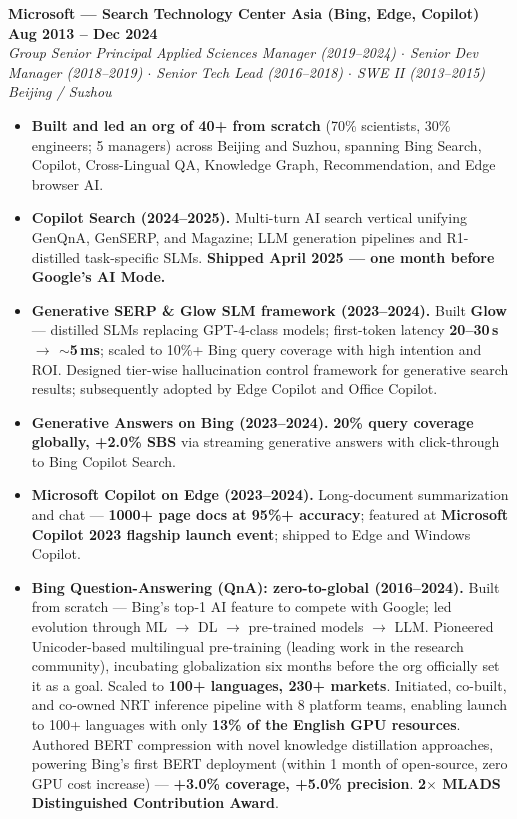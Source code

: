 \documentclass[10.5pt,letterpaper]{article}
\newcommand{\role}[4]{%
  \noindent\textbf{#1} \hfill \textbf{#3}\\
  \textit{#2} \hfill \textit{#4}\par\vspace{1pt}}
\begin{document}
\vspace{2pt}
\role{Microsoft --- Search Technology Center Asia (Bing, Edge, Copilot)}{Group Senior Principal Applied Sciences Manager (2019--2024) $\cdot$ Senior Dev Manager (2018--2019) $\cdot$ Senior Tech Lead (2016--2018) $\cdot$ SWE II (2013--2015)}{Aug 2013 -- Dec 2024}{Beijing / Suzhou}
\begin{itemize}
  \item \textbf{Built and led an org of 40+ from scratch} (70\% scientists, 30\% engineers; 5 managers) across Beijing and Suzhou, spanning Bing Search, Copilot, Cross-Lingual QA, Knowledge Graph, Recommendation, and Edge browser AI.
  \item \textbf{Copilot Search (2024--2025).} Multi-turn AI search vertical unifying GenQnA, GenSERP, and Magazine; LLM generation pipelines and R1-distilled task-specific SLMs. \textbf{Shipped April 2025 --- one month before Google's AI Mode.}
  \item \textbf{Generative SERP \& Glow SLM framework (2023--2024).} Built \textbf{Glow} --- distilled SLMs replacing GPT-4-class models; first-token latency \textbf{20--30\,s $\to$ $\sim$5\,ms}; scaled to 10\%+ Bing query coverage with high intention and ROI. Designed tier-wise hallucination control framework for generative search results; subsequently adopted by Edge Copilot and Office Copilot.
  \item \textbf{Generative Answers on Bing (2023--2024).} \textbf{20\% query coverage globally, +2.0\% SBS} via streaming generative answers with click-through to Bing Copilot Search.
  \item \textbf{Microsoft Copilot on Edge (2023--2024).} Long-document summarization and chat --- \textbf{1000+ page docs at 95\%+ accuracy}; featured at \textbf{Microsoft Copilot 2023 flagship launch event}; shipped to Edge and Windows Copilot.
  \item \textbf{Bing Question-Answering (QnA): zero-to-global (2016--2024).} Built from scratch --- Bing's top-1 AI feature to compete with Google; led evolution through ML $\to$ DL $\to$ pre-trained models $\to$ LLM. Pioneered Unicoder-based multilingual pre-training (leading work in the research community), incubating globalization six months before the org officially set it as a goal. Scaled to \textbf{100+ languages, 230+ markets}. Initiated, co-built, and co-owned NRT inference pipeline with 8 platform teams, enabling launch to 100+ languages with only \textbf{13\% of the English GPU resources}. Authored BERT compression with novel knowledge distillation approaches, powering Bing's first BERT deployment (within 1 month of open-source, zero GPU cost increase) --- \textbf{+3.0\% coverage, +5.0\% precision}. \textbf{2$\times$ MLADS Distinguished Contribution Award}.

\end{itemize}
\end{document}
